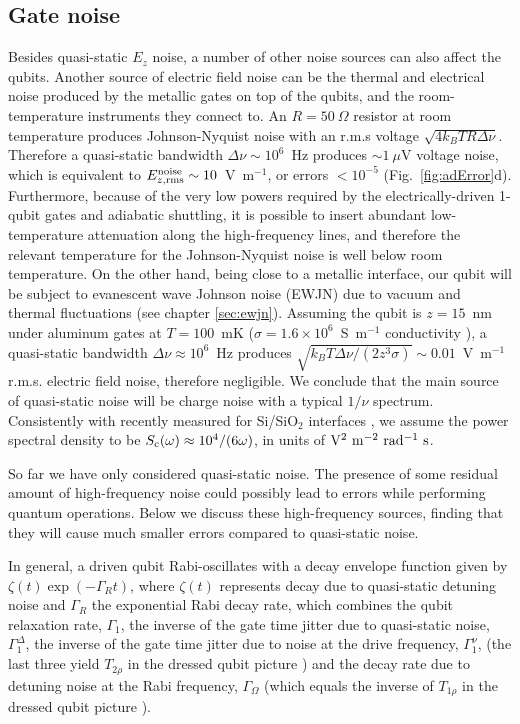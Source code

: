 \subsection{Gate noise} \label{sec:gatenoise}
Besides quasi-static $E_z$ noise, a number of other noise sources can also affect the qubits. Another source of electric field noise can be the thermal and electrical noise produced by the metallic gates on top of the qubits, and the room-temperature instruments they connect to. An $R=50~\Omega$ resistor at room temperature produces Johnson-Nyquist noise with an r.m.s voltage $\sqrt{4k_BTR\Delta\nu}$. Therefore a quasi-static bandwidth $\Delta\nu\sim10^6$~Hz produces $\sim1~\mu$V voltage noise, which is equivalent to $E_{z,\rm rms}^{\rm noise}\sim10$~V~m$^{-1}$, or errors $<10^{-5}$ (Fig.~\ref{fig:adError}d). Furthermore, because of the very low powers required by the electrically-driven 1-qubit gates and adiabatic shuttling, it is possible to insert abundant low-temperature attenuation along the high-frequency lines, and therefore the relevant temperature for the Johnson-Nyquist noise is well below room temperature. On the other hand, being close to a metallic interface, our qubit will be subject to evanescent wave Johnson noise (EWJN) due to vacuum and thermal fluctuations (see chapter \ref{sec:ewjn}). Assuming the qubit is $z=15$~nm under aluminum gates at $T=100$~mK ($\sigma=1.6\times10^6$~S~m$^{-1}$ conductivity \cite{Tenberg2018}), a quasi-static bandwidth $\Delta\nu\approx10^6$~Hz produces \cite{Henkel1999} $\sqrt{k_BT\Delta\nu/(2z^3\sigma)}\sim0.01$~V~m$^{-1}$ r.m.s. electric field noise, therefore negligible. We conclude that the main source of quasi-static noise will be charge noise with a typical $1/\nu$ spectrum. Consistently with recently measured for Si/SiO$_2$ interfaces \cite{Freeman2017}, we assume the power spectral density to be $S_{\rm c}(\omega)\approx10^4/(6\omega)$, in units of ${\rm V^2~m^{-2}~rad^{-1}~s}$.

So far we have only considered quasi-static noise. The presence of some residual amount of high-frequency noise could possibly lead to errors while performing quantum operations. Below we discuss these high-frequency sources, finding that they will cause much smaller errors compared to quasi-static noise.

In general, a driven qubit Rabi-oscillates with a decay envelope function given by $\zeta(t)\exp(-\Gamma_Rt)$, \cite{Bylander2011} where $\zeta(t)$ represents decay due to quasi-static detuning noise and $\Gamma_R$ the exponential Rabi decay rate, which combines the qubit relaxation rate, $\Gamma_1$, the inverse of the gate time jitter due to quasi-static noise, $\Gamma_1^{\Delta}$, the inverse of the gate time jitter due to noise at the drive frequency, $\Gamma_1^{\nu}$, (the last three yield $T_{2\rho}$ in the dressed qubit picture \cite{Laucht2016}) and the decay rate due to detuning noise at the Rabi frequency, $\Gamma_\Omega$ (which equals the inverse of $T_{1\rho}$ in the dressed qubit picture \cite{Yan2013,Laucht2016}).

